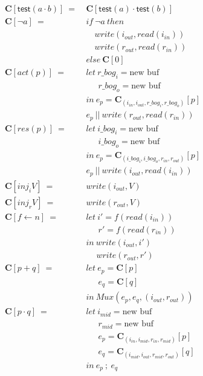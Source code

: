 \documentclass[12pt, letterpaper]{article}
\begin{document}
{\begin{align*}
    \mathbf{C}[\mathsf{test}(a \cdot b)]\ 
       =\ &\mathbf{C}[\mathsf{test}(a) \cdot \mathsf{test}(b)] \\
    \mathbf{C}[\neg a]\ 
       =\ 
       &if\ \neg a\ then\\
       &\quad write(i_{out}, read(i_{in}))\\
       &\quad write(r_{out}, read(r_{in}))\\
       &else\ \mathbf{C}[0]\\
    \mathbf{C}[act(p)]\ 
      =\ &
      let\ r\_bog_i = \text{new buf}\\
      &\quad\ \ r\_bog_o = \text{new buf}\\
      &in\ e_p = \mathbf{C}_{(i_{in}, i_{out}, r\_bog_i, r\_bog_o)}[p]\\
      &e_p\ ||\ write(r_{out}, read(r_{in}))
      \\
    \mathbf{C}[res(p)]\ 
      =\ &
      let\ i\_bog_i = \text{new buf}\\
      &\quad\ \ i\_bog_o = \text{new buf}\\
      &in\ e_p = \mathbf{C}_{(i\_bog_i, i\_bog_o, r_{in}, r_{out})}[p]\\
      &e_p\ ||\ write(i_{out}, read(i_{in}))
      \\
    \mathbf{C}[inj_iV]\ 
      =\ &
      write(i_{out}, V)
      \\
    \mathbf{C}[inj_rV]\ 
      =\ &
      write(r_{out}, V)
      \\
    \mathbf{C}[f \leftarrow n]\ 
      =\ &
      let\ i' = f(read(i_{in}))\\
      &\quad\ \ r' = f(read(r_{in}))\\
      &in\ write(i_{out}, i')\\
      &\quad \ write(r_{out}, r')
      \\
    \mathbf{C}[p + q]\ 
      =\ &
      let\ e_p = \mathbf{C}[p]\\
      &\quad\ \ e_q = \mathbf{C}[q]\\
      &in\ Mux(e_p, e_q, (i_{out},r_{out}))
      \\
    \mathbf{C}[p \cdot q]\ 
      =\ &
      let\ i_{mid} = \text{new buf}\\
      &\quad\ \ r_{mid} = \text{new buf}\\
      &\quad\ \ e_p = \mathbf{C}_{(i_{in}, i_{mid}, r_{in}, r_{mid})}[p]\\
      &\quad\ \ e_q = \mathbf{C}_{(i_{mid}, i_{out}, r_{mid}, r_{out})}[q]\\
      &in\ e_p\ ;\ e_q
  \end{align*}
  }
\end{document}
